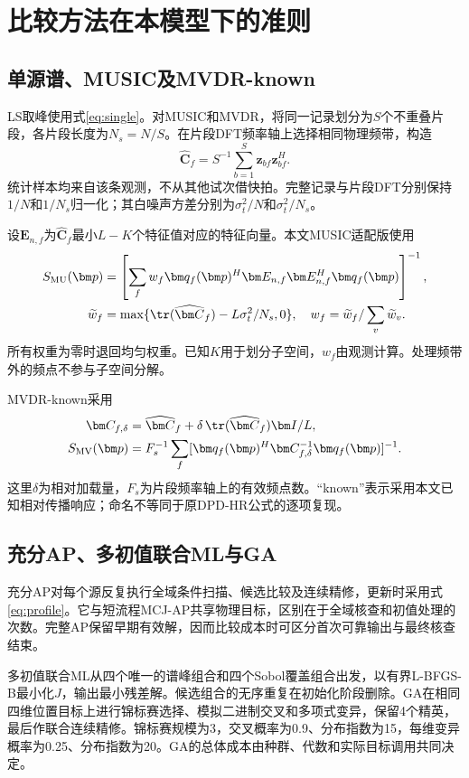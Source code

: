 \section{比较方法在本模型下的准则}\label{app:baselines}
\subsection{单源谱、MUSIC及MVDR-known}
LS取峰使用式\eqref{eq:single}。对MUSIC和MVDR，将同一记录划分为$S$个不重叠片段，各片段长度为$N_s=N/S$。在片段DFT频率轴上选择相同物理频带，构造
\begin{equation}
 \widehat{\bm C}_f=S^{-1}\sum_{b=1}^S\bm z_{bf}\bm z_{bf}^H .
\end{equation}
统计样本均来自该条观测，不从其他试次借快拍。完整记录与片段DFT分别保持$1/N$和$1/N_s$归一化；其白噪声方差分别为$\sigma_t^2/N$和$\sigma_t^2/N_s$。

设$\bm E_{n,f}$为$\widehat{\bm C}_f$最小$L-K$个特征值对应的特征向量。本文MUSIC适配版使用
\begin{align}
 S_{\mathrm{MU}}(\bm p)&=\left[\sum_f w_f
 \bm q_f(\bm p)^H\bm E_{n,f}\bm E_{n,f}^H\bm q_f(\bm p)\right]^{-1},\label{eq:music}\\
 \widetilde w_f&=\max\{\tr(\widehat{\bm C}_f)-L\sigma_t^2/N_s,0\},\quad
 w_f=\widetilde w_f/\sum_v\widetilde w_v .\nonumber
\end{align}
所有权重为零时退回均匀权重。已知$K$用于划分子空间，$w_f$由观测计算。处理频带外的频点不参与子空间分解。

MVDR-known采用
\begin{align}
 \bm C_{f,\delta}&=\widehat{\bm C}_f+
 \delta\,\tr(\widehat{\bm C}_f)\bm I/L,\nonumber\\
 S_{\mathrm{MV}}(\bm p)&=F_s^{-1}\sum_f
 [\bm q_f(\bm p)^H\bm C_{f,\delta}^{-1}\bm q_f(\bm p)]^{-1} .\label{eq:mvdr}
\end{align}
这里$\delta$为相对加载量，$F_s$为片段频率轴上的有效频点数。“known”表示采用本文已知相对传播响应；命名不等同于原DPD-HR公式的逐项复现。

\subsection{充分AP、多初值联合ML与GA}
充分AP对每个源反复执行全域条件扫描、候选比较及连续精修，更新时采用式\eqref{eq:profile}。它与短流程MCJ-AP共享物理目标，区别在于全域核查和初值处理的次数。完整AP保留早期有效解，因而比较成本时可区分首次可靠输出与最终核查结束。

多初值联合ML从四个唯一的谱峰组合和四个Sobol覆盖组合出发，以有界L-BFGS-B最小化$J$，输出最小残差解。候选组合的无序重复在初始化阶段删除。GA在相同四维位置目标上进行锦标赛选择、模拟二进制交叉和多项式变异\cite{DebAgrawal1995}，保留4个精英，最后作联合连续精修。锦标赛规模为3，交叉概率为0.9、分布指数为15，每维变异概率为0.25、分布指数为20。GA的总体成本由种群、代数和实际目标调用共同决定。

